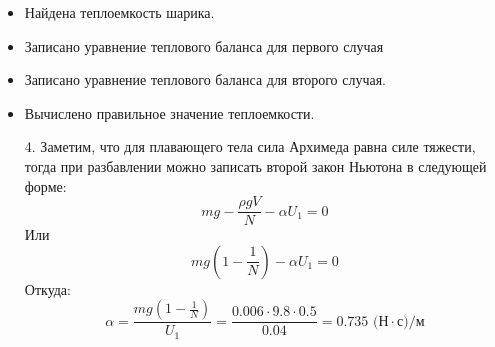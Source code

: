 \markSection

\begin{itemize}
\item Найдена теплоемкость шарика.
\item Записано уравнение теплового баланса для первого случая
\item Записано уравнение теплового баланса для второго случая.
\item Вычислено правильное значение теплоемкости.
\end{itemize}
\begin{enumerate}
\item [4.] Заметим, что для плавающего тела сила Архимеда равна силе тяжести, тогда при разбавлении можно записать второй закон Ньютона в следующей форме:
$$mg-\frac{\rho gV}{N}-\alpha U_1=0$$
Или
$$mg\left(1-\frac{1}{N}\right)-\alpha U_1=0$$
Откуда:
$$\alpha=\frac{mg\left(1-\frac{1}{N}\right)}{U_1}=\frac{0.006\cdot9.8\cdot0.5}{0.04}=0.735\text{ (Н}\cdot\text{с)/м}$$
\end{enumerate}

\markSection

